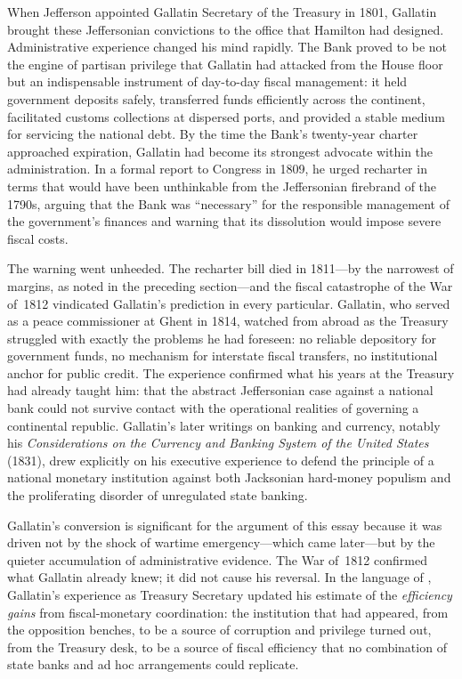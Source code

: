 \documentclass[12pt]{article}
\begin{document}
When Jefferson appointed Gallatin Secretary of the Treasury in 1801,
Gallatin brought these Jeffersonian convictions to the office that
Hamilton had designed.  Administrative experience changed his mind
rapidly.  The Bank proved to be not the engine of partisan privilege
that Gallatin had attacked from the House floor but an indispensable
instrument of day-to-day fiscal management: it held government deposits
safely, transferred funds efficiently across the continent, facilitated
customs collections at dispersed ports, and provided a stable medium for
servicing the national debt.  By the time the Bank's twenty-year charter
approached expiration, Gallatin had become its strongest advocate within
the administration.  In a formal report to Congress in 1809, he urged
recharter in terms that would have been unthinkable from the
Jeffersonian firebrand of the 1790s, arguing that the Bank was
``necessary'' for the responsible management of the government's
finances and warning that its dissolution would impose severe fiscal
costs.

The warning went unheeded.  The recharter bill died in 1811---by the
narrowest of margins, as noted in the preceding section---and the fiscal
catastrophe of the War of~1812 vindicated Gallatin's prediction in every
particular.  Gallatin, who served as a peace commissioner at Ghent in
1814, watched from abroad as the Treasury struggled with exactly the
problems he had foreseen: no reliable depository for government funds,
no mechanism for interstate fiscal transfers, no institutional anchor
for public credit.  The experience confirmed what his years at the
Treasury had already taught him: that the abstract Jeffersonian case
against a national bank could not survive contact with the operational
realities of governing a continental republic.  Gallatin's later
writings on banking and currency, notably his \textit{Considerations on
the Currency and Banking System of the United States} (1831), drew
explicitly on his executive experience to defend the principle of a
national monetary institution against both Jacksonian hard-money
populism and the proliferating disorder of unregulated state banking.

Gallatin's conversion is significant for the argument of this essay
because it was driven not by the shock of wartime emergency---which came
later---but by the quieter accumulation of administrative evidence.
The War of~1812 confirmed what Gallatin already knew; it did not cause
his reversal.  In the language of \citet{Sargent2011}, Gallatin's
experience as Treasury Secretary updated his estimate of the
\emph{efficiency gains} from fiscal-monetary coordination: the
institution that had appeared, from the opposition benches, to be a
source of corruption and privilege turned out, from the Treasury desk,
to be a source of fiscal efficiency that no combination of state banks
and ad hoc arrangements could replicate.
\end{document}

